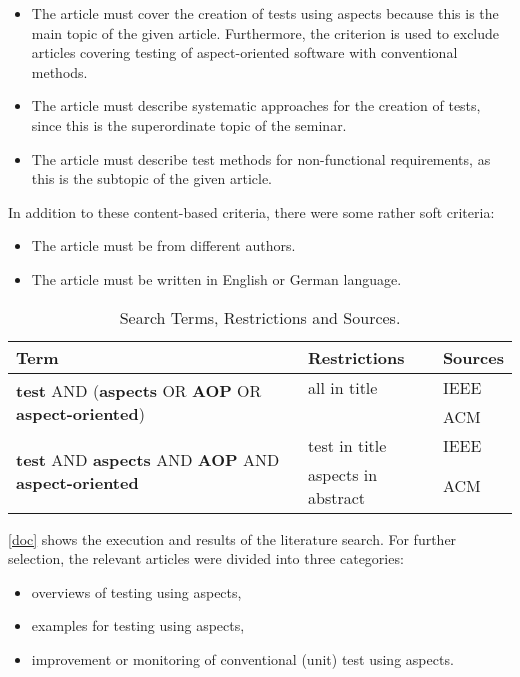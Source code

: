 \begin{itemize}
\item The article must cover the creation of tests using aspects because this is the main topic of the given article. Furthermore, the criterion is used to exclude articles covering testing of aspect-oriented software with conventional methods.
\item The article must describe systematic approaches for the creation of tests, since this is the superordinate topic of the seminar. 
\item The article must describe test methods for non-functional requirements, as this is the subtopic of the given article.
\end{itemize}

In addition to these content-based criteria, there were some rather soft criteria:
\begin{itemize}
\item The article must be from different authors.
\item The article must be written in English or German language.
\end{itemize}


\begin{table}[h]
\caption{Search Terms, Restrictions and Sources.}
	\begin{tabular}{p{6.5cm}|p{4.5cm}|p{2cm}}
	\hline
	\textbf{Term} & \textbf{Restrictions} & \textbf{Sources}\\
	\hline
	\multirow{2}{8cm}{\textbf{test} AND (\textbf{aspects} OR \textbf{AOP} OR \textbf{aspect-oriented})} & \tabitem all in title  &  \tabitem IEEE\\
	& \quad & \tabitem ACM \\
	\hline
	\multirow{2}{8cm}{\textbf{test} AND \textbf{aspects} AND \textbf{AOP} AND \textbf{aspect-oriented}} & \tabitem test in title  &  \tabitem IEEE\\
	& \tabitem aspects in abstract & \tabitem ACM \\
	\hline
	\end{tabular}
\label{restrict}
\end{table}

\newpage
\autoref{doc} shows the execution and results of the literature search. For further selection, the relevant articles were divided into three categories:

\begin{itemize}
\item overviews of testing using aspects,
\item examples for testing using aspects,
\item improvement or monitoring of conventional (unit) test using aspects. 
\end{itemize}

